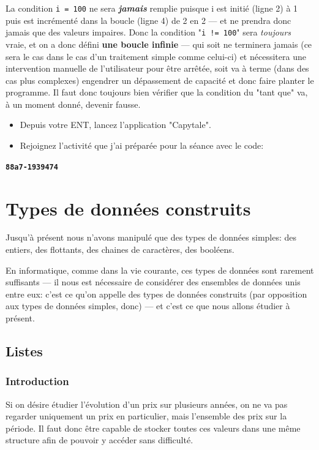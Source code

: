 \documentclass[12pt]{article}
\begin{document}
	La condition \texttt{i = 100} ne sera \textbf{\textit{jamais}} remplie puisque i est initié (ligne 2) à 1 puis est incrémenté dans la boucle (ligne 4) de 2 en 2 --- et ne prendra donc jamais que des valeurs impaires. Donc la condition "\texttt{i != 100}" sera \textit{toujours} vraie, et on a donc défini \textbf{une boucle infinie} --- qui soit ne terminera jamais (ce sera le cas dans le cas d'un traitement simple comme celui-ci) et nécessitera une intervention manuelle de l'utilisateur pour être arrêtée, soit va à terme (dans des cas plus complexes) engendrer un dépassement de capacité et donc faire planter le programme. Il faut donc toujours bien vérifier que la condition du "tant que" va, à un moment donné, devenir fausse.
	
	\begin{tcolorbox}[colframe=red!75!black, boxrule=2pt]
		\begin{minipage}{1\textwidth}
			\begin{itemize}				
				\item Depuis votre ENT, lancez l'application "Capytale".
				\item Rejoignez l'activité que j'ai préparée pour la séance avec le code:
			\end{itemize}
			\centering
			\textbf{\texttt{88a7-1939474}}
		\end{minipage}
	\end{tcolorbox}
	
	\pagebreak
	
	\section{Types de données construits}
	Jusqu'à présent nous n'avons manipulé que des types de données simples: des entiers, des flottants, des chaines de caractères, des booléens.
	
	En informatique, comme dans la vie courante, ces types de données sont rarement suffisants --- il nous est nécessaire de considérer des ensembles de données unis entre eux: c'est ce qu'on appelle des types de données construits (par opposition aux types de données simples, donc) --- et c'est ce que nous allons étudier à présent.
	\subsection{Listes}
	\subsubsection*{Introduction}
	Si on désire étudier l'évolution d’un prix sur plusieurs années, on ne va pas regarder uniquement un prix en particulier, mais l'ensemble des prix sur la période. Il faut donc être capable de stocker toutes ces valeurs dans une même structure afin de pouvoir y accéder sans difficulté.
	
\end{document}
